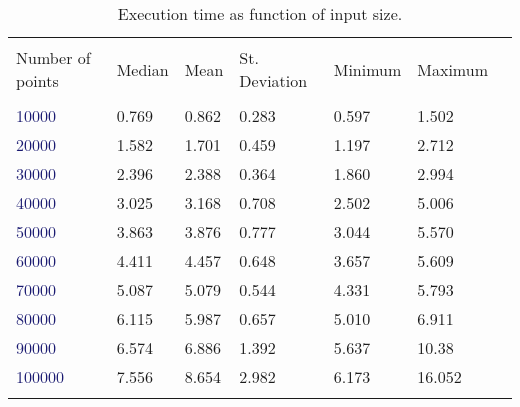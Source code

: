 \documentclass[
12pt,
a4paper,
oneside,
headinclude,
footinclude]{report}
\theoremstyle{definition} %
\begin{document}
\begin{table}[h]
	\centering %
	
	\begin{tabular}{l l l l l l l} %
		\hline
		\hline 
		\\[-1.5ex]
		\textcolor{BrickRed}{Number of points} & \textcolor{BrickRed}{Median} & \textcolor{BrickRed}{Mean} & \textcolor{BrickRed}{St. Deviation} & \textcolor{BrickRed}{Minimum} & \textcolor{BrickRed}{Maximum}\\ [0.5ex]
		\hline %
		\\[-1.5ex]		
			\textcolor{MidnightBlue}{10000} & 0.769  & 0.862 & 0.283 & 0.597 & 1.502\\
			\textcolor{MidnightBlue}{20000} & 1.582  & 1.701 & 0.459 & 1.197 & 2.712\\
			\textcolor{MidnightBlue}{30000} & 2.396  & 2.388 & 0.364 & 1.860 & 2.994\\
			\textcolor{MidnightBlue}{40000} & 3.025  & 3.168 & 0.708 & 2.502 & 5.006\\
			\textcolor{MidnightBlue}{50000} & 3.863  & 3.876 & 0.777 & 3.044 & 5.570\\
			\textcolor{MidnightBlue}{60000} & 4.411  & 4.457 & 0.648 & 3.657 & 5.609\\
			\textcolor{MidnightBlue}{70000} & 5.087  & 5.079 & 0.544 & 4.331 & 5.793\\
			\textcolor{MidnightBlue}{80000} & 6.115  & 5.987 & 0.657 & 5.010 & 6.911\\
			\textcolor{MidnightBlue}{90000} & 6.574  & 6.886 & 1.392 & 5.637 & 10.38\\
			\textcolor{MidnightBlue}{100000} & 7.556 & 8.654 & 2.982 & 6.173 & 16.052\\[1ex]
		
		\hline %
		\caption{Execution time as function of input size.}
	\end{tabular}
\end{table}



%
%




\end{document}

